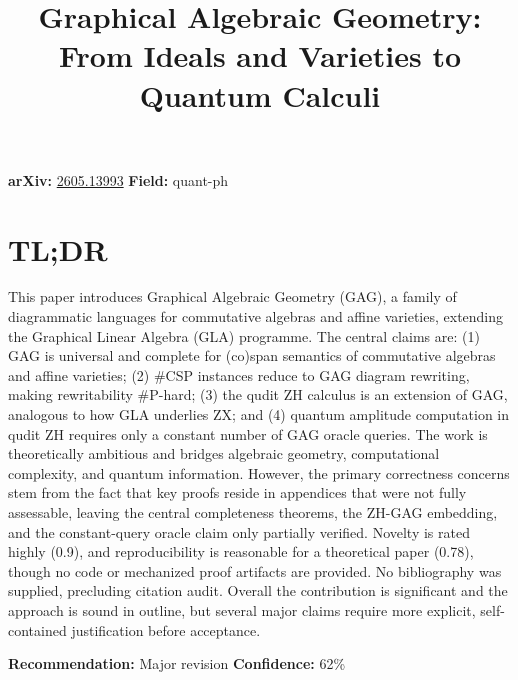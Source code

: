 \documentclass[11pt]{article}
\title{Graphical Algebraic Geometry: From Ideals and Varieties to Quantum Calculi}
\date{}
\begin{document}
\maketitle

\noindent\textbf{arXiv:} \href{https://arxiv.org/abs/2605.13993}{2605.13993} \quad \textbf{Field:} quant-ph\\

\section*{TL;DR}
This paper introduces Graphical Algebraic Geometry (GAG), a family of diagrammatic languages for commutative algebras and affine varieties, extending the Graphical Linear Algebra (GLA) programme. The central claims are: (1) GAG is universal and complete for (co)span semantics of commutative algebras and affine varieties; (2) \#CSP instances reduce to GAG diagram rewriting, making rewritability \#P-hard; (3) the qudit ZH calculus is an extension of GAG, analogous to how GLA underlies ZX; and (4) quantum amplitude computation in qudit ZH requires only a constant number of GAG oracle queries. The work is theoretically ambitious and bridges algebraic geometry, computational complexity, and quantum information. However, the primary correctness concerns stem from the fact that key proofs reside in appendices that were not fully assessable, leaving the central completeness theorems, the ZH-GAG embedding, and the constant-query oracle claim only partially verified. Novelty is rated highly (0.9), and reproducibility is reasonable for a theoretical paper (0.78), though no code or mechanized proof artifacts are provided. No bibliography was supplied, precluding citation audit. Overall the contribution is significant and the approach is sound in outline, but several major claims require more explicit, self-contained justification before acceptance.

\textbf{Recommendation:} Major revision \quad \textbf{Confidence:} 62\%\\
\end{document}
